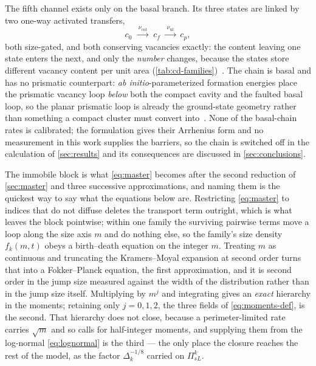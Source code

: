 The fifth channel exists only on the basal branch. Its three states are
linked by two one-way
activated transfers,
\begin{equation}
  c_0 \;\xrightarrow{\;\nu_{\mathrm{col}}\;}\; c_f
      \;\xrightarrow{\;\nu_{\mathrm{uf}}\;}\; c_p ,
  \label{eq:basal-chain}
\end{equation}
both size-gated, and both conserving vacancies exactly: the content leaving one
state enters the next, and only the \emph{number} changes, because the states
store different vacancy content per unit area
(\cref{tab:cd-families})~\citep{liu2020two,varvenne2014vacancy,marchrico2025}.
The chain is basal and has no prismatic counterpart: \emph{ab initio}-parameterized
formation energies place the prismatic vacancy \aloop{} loop \emph{below} both
the compact cavity and the faulted basal loop, so the planar prismatic loop is
already the ground-state geometry rather than something a compact cluster must
convert into~\citep{varvenne2014vacancy}. None of the basal-chain rates
is calibrated; the formulation gives their Arrhenius form and no measurement in
this work supplies the barriers, so the chain is switched off in the calculation
of \cref{sec:results} and its consequences are discussed in
\cref{sec:conclusions}.

The immobile block is what \cref{eq:master} becomes after the second reduction
of \cref{sec:master} and three successive approximations, and naming them is
the quickest way to say what the equations below are. Restricting
\cref{eq:master} to indices that do not diffuse deletes the transport term
outright, which is what leaves the block pointwise; within one family the
surviving pairwise terms move a loop along the size axis $m$ and do nothing
else, so the family's size density $f_k(m,t)$ obeys a birth--death equation on
the integer $m$. Treating $m$ as continuous and truncating the Kramers--Moyal
expansion at second order turns that into a Fokker--Planck equation, the first
approximation, and it is second order in the jump size measured against the
width of the distribution rather than in the jump size itself. Multiplying by
$m^{j}$ and integrating gives an \emph{exact} hierarchy in the moments;
retaining only $j=0,1,2$, the three fields of \cref{eq:moments-def}, is the
second. That hierarchy does not close, because a perimeter-limited rate carries
$\sqrt m$ and so calls for half-integer moments, and supplying them from the
log-normal \cref{eq:lognormal} is the third --- the only place the closure
reaches the rest of the model, as the factor $\Delta_k^{-1/8}$ carried on
$\Pi^k_{sL}$.

